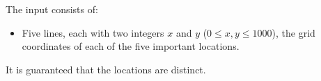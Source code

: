 
    The input consists of:
    \begin{itemize}
        \item Five lines, each with two integers $x$ and $y$ ($0 \le x, y \le 1000$),
            the grid coordinates of each of the five important locations.
    \end{itemize}
    It is guaranteed that the locations are distinct.
